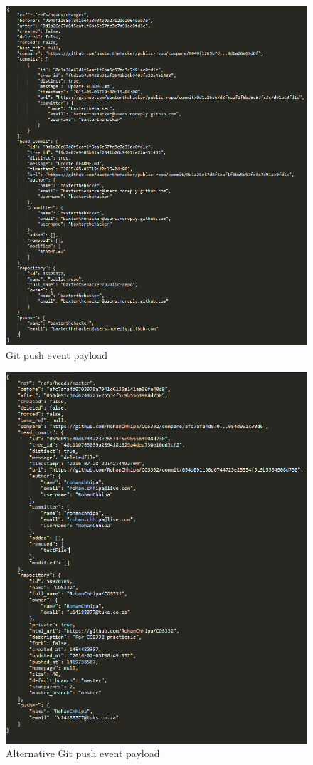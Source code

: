 \documentclass[11pt,a4paper]{article}
\begin{document}
\begin{figure}[H]
	\centering
	\includegraphics[width=\linewidth]{../Images/gitpush}
	\caption{Git push event payload}
\end{figure}

\begin{figure}[H]
	\centering
	\includegraphics[width=\linewidth]{../Images/altgitpush}
	\caption{Alternative Git push event payload}
\end{figure}
\end{document}
